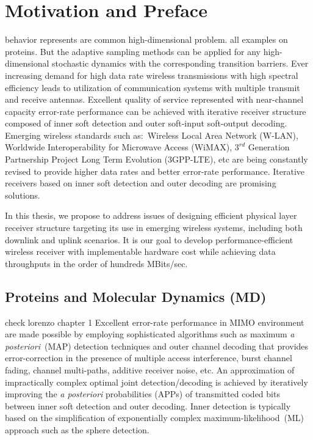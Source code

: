 \chapter{Motivation and Preface}
\label{ch:Intro}
behavior represents are common high-dimensional problem. all examples on proteins. But the adaptive sampling methods can be applied for any high-dimensional stochastic dynamics with the corresponding transition barriers.
Ever increasing demand for high data rate wireless transmissions with high spectral efficiency leads to utilization of communication systems with multiple transmit and receive antennas. Excellent quality of service represented with near-channel capacity error-rate performance can be achieved with iterative receiver structure composed of inner soft detection and outer soft-input soft-output decoding. Emerging wireless standards such as:~Wireless Local Area Network (W-LAN), Worldwide Interoperability for Microwave Access (WiMAX), $3^{rd}$ Generation Partnership Project Long Term Evolution (3GPP-LTE), etc are being constantly revised to provide higher data rates and better error-rate performance. Iterative receivers based on inner soft detection and outer decoding are promising solutions.

In this thesis, we propose to address issues of designing efficient physical layer receiver structure targeting its use in emerging wireless systems, including both downlink and uplink scenarios. It is our goal to develop performance-efficient wireless receiver with implementable hardware cost while achieving data throughputs in the order of hundreds MBits/sec. 

\section{Proteins and Molecular Dynamics (MD)}
\label{sec:MD}
check lorenzo chapter 1
Excellent error-rate performance in MIMO environment are made possible by employing sophisticated algorithms such as maximum \emph{a posteriori}~(MAP) detection techniques and outer channel decoding that provides error-correction in the presence of multiple access interference, burst channel fading, channel multi-paths, additive receiver noise, etc. An approximation of impractically complex optimal joint detection/decoding is achieved by iteratively improving the \emph{a posteriori} probabilities (APPs) of transmitted coded bits between inner soft detection and outer decoding. Inner detection is typically based on the simplification of exponentially complex maximum-likelihood~(ML) approach such as the sphere detection. 


